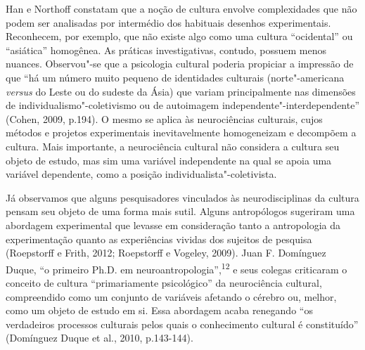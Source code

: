 Han e Northoff constatam que a noção de cultura envolve complexidades
que não podem ser analisadas por intermédio dos habituais desenhos
experimentais. Reconhecem, por exemplo, que não existe algo como uma
cultura ``ocidental'' ou ``asiática'' homogênea. As práticas
investigativas, contudo, possuem menos nuances. Observou"-se que a
psicologia cultural poderia propiciar a impressão de que ``há um número
muito pequeno de identidades culturais (norte"-americana \emph{versus} do
Leste ou do sudeste da Ásia) que variam principalmente nas dimensões de
individualismo"-coletivismo ou de autoimagem
independente"-interdependente'' (Cohen, 2009, p.194). O mesmo se aplica
às neurociências culturais, cujos métodos e projetos experimentais
inevitavelmente homogeneizam e decompõem a cultura. Mais importante, a
neurociência cultural não considera a cultura seu objeto de estudo, mas
sim uma variável independente na qual se apoia uma variável dependente,
como a posição individualista"-coletivista.

Já observamos que alguns pesquisadores vinculados às neurodisciplinas da
cultura pensam seu objeto de uma forma mais sutil. Alguns antropólogos
sugeriram uma abordagem experimental que levasse em consideração tanto a
antropologia da experimentação quanto as experiências vividas dos
sujeitos de pesquisa (Roepstorff e Frith, 2012; Roepstorff e Vogeley,
2009). Juan F. Domínguez Duque, ``o primeiro Ph.D. em
neuroantropologia'',\textsuperscript{12} e seus colegas criticaram o
conceito de cultura ``primariamente psicológico'' da neurociência
cultural, compreendido como um conjunto de variáveis afetando o cérebro
ou, melhor, como um objeto de estudo em si. Essa abordagem acaba
renegando ``os verdadeiros processos culturais pelos quais o
conhecimento cultural é constituído'' (Domínguez Duque et al., 2010,
p.143-144).

